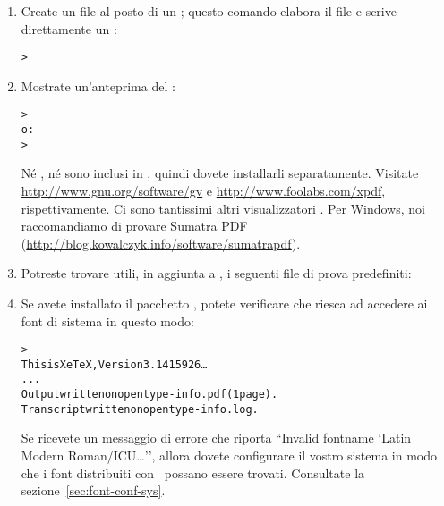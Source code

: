 \documentclass{article}
\begin{document}
\begin{enumerate}
\item Create un file  al posto di un \dvi{}; questo comando
elabora il file  e scrive direttamente un :
\begin{alltt}
> 
\end{alltt}

\item Mostrate un'anteprima del :
\begin{alltt}
> 
\textrm{o:}
> 
\end{alltt}
Né , né  sono inclusi in \TL{}, quindi dovete
installarli separatamente. Visitate \url{http://www.gnu.org/software/gv} e
\url{http://www.foolabs.com/xpdf}, rispettivamente. Ci sono tantissimi
altri visualizzatori . Per Windows, noi raccomandiamo di provare
Sumatra PDF (\url{http://blog.kowalczyk.info/software/sumatrapdf}).

\item Potreste trovare utili, in aggiunta a , i
seguenti file di prova predefiniti:


\item Se avete installato il pacchetto , potete verificare che
riesca ad accedere ai font di sistema in questo modo:
\begin{alltt}
> 
This is XeTeX, Version 3.1415926\dots
...
Output written on opentype-info.pdf (1 page).
Transcript written on opentype-info.log.
\end{alltt}

Se ricevete un messaggio di errore che riporta ``Invalid fontname `Latin
Modern Roman/ICU\dots'', allora dovete configurare il vostro sistema in
modo che i font distribuiti con \TL\ possano essere trovati. Consultate la
sezione~\ref{sec:font-conf-sys}.

\end{enumerate}
\end{document}

